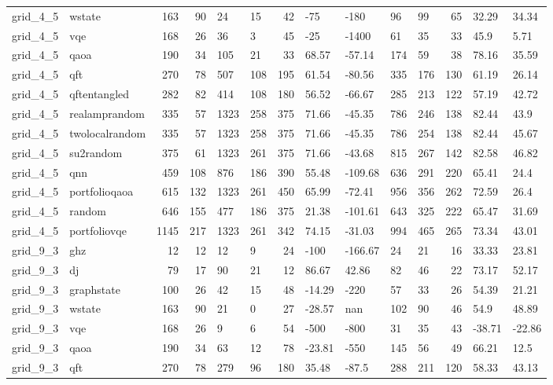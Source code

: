 \begin{longtable}{llrrllrllllrll}
grid\_4\_5 & wstate & 163 & 90 & 24 & 15 & 42 & -75 & -180 & 96 & 99 & 65 & 32.29 & 34.34 \\
grid\_4\_5 & vqe & 168 & 26 & 36 & 3 & 45 & -25 & -1400 & 61 & 35 & 33 & 45.9 & 5.71 \\
grid\_4\_5 & qaoa & 190 & 34 & 105 & 21 & 33 & 68.57 & -57.14 & 174 & 59 & 38 & 78.16 & 35.59 \\
grid\_4\_5 & qft & 270 & 78 & 507 & 108 & 195 & 61.54 & -80.56 & 335 & 176 & 130 & 61.19 & 26.14 \\
grid\_4\_5 & qftentangled & 282 & 82 & 414 & 108 & 180 & 56.52 & -66.67 & 285 & 213 & 122 & 57.19 & 42.72 \\
grid\_4\_5 & realamprandom & 335 & 57 & 1323 & 258 & 375 & 71.66 & -45.35 & 786 & 246 & 138 & 82.44 & 43.9 \\
grid\_4\_5 & twolocalrandom & 335 & 57 & 1323 & 258 & 375 & 71.66 & -45.35 & 786 & 254 & 138 & 82.44 & 45.67 \\
grid\_4\_5 & su2random & 375 & 61 & 1323 & 261 & 375 & 71.66 & -43.68 & 815 & 267 & 142 & 82.58 & 46.82 \\
grid\_4\_5 & qnn & 459 & 108 & 876 & 186 & 390 & 55.48 & -109.68 & 636 & 291 & 220 & 65.41 & 24.4 \\
grid\_4\_5 & portfolioqaoa & 615 & 132 & 1323 & 261 & 450 & 65.99 & -72.41 & 956 & 356 & 262 & 72.59 & 26.4 \\
grid\_4\_5 & random & 646 & 155 & 477 & 186 & 375 & 21.38 & -101.61 & 643 & 325 & 222 & 65.47 & 31.69 \\
grid\_4\_5 & portfoliovqe & 1145 & 217 & 1323 & 261 & 342 & 74.15 & -31.03 & 994 & 465 & 265 & 73.34 & 43.01 \\
grid\_9\_3 & ghz & 12 & 12 & 12 & 9 & 24 & -100 & -166.67 & 24 & 21 & 16 & 33.33 & 23.81 \\
grid\_9\_3 & dj & 79 & 17 & 90 & 21 & 12 & 86.67 & 42.86 & 82 & 46 & 22 & 73.17 & 52.17 \\
grid\_9\_3 & graphstate & 100 & 26 & 42 & 15 & 48 & -14.29 & -220 & 57 & 33 & 26 & 54.39 & 21.21 \\
grid\_9\_3 & wstate & 163 & 90 & 21 & 0 & 27 & -28.57 & nan & 102 & 90 & 46 & 54.9 & 48.89 \\
grid\_9\_3 & vqe & 168 & 26 & 9 & 6 & 54 & -500 & -800 & 31 & 35 & 43 & -38.71 & -22.86 \\
grid\_9\_3 & qaoa & 190 & 34 & 63 & 12 & 78 & -23.81 & -550 & 145 & 56 & 49 & 66.21 & 12.5 \\
grid\_9\_3 & qft & 270 & 78 & 279 & 96 & 180 & 35.48 & -87.5 & 288 & 211 & 120 & 58.33 & 43.13 \\

\end{longtable}
